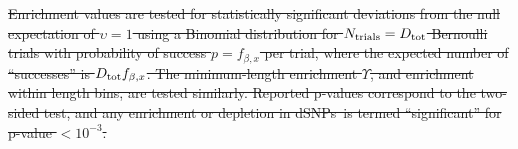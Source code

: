 \documentclass[9pt,twocolumn,twoside,lineno]{pnas-new} %
\newcommand{\dSNPs}{dSNPs~}
\newcommand{\hydrochar}{hydrophobicity class}
\providecommand{\DIFdel}[1]{{\protect\color{red}\sout{#1}}}                      %
\begin{document}
\DIFdel{Enrichment values are tested for statistically significant deviations from the null expectation of $\upsilon = 1$ using a Binomial distribution for $N_{\rm trials}=D_{\rm tot}$ Bernoulli trials with probability of success $p=f_{\beta,x}$ per trial, where the expected number of ``successes'' is $D_{\rm tot}f_{\beta,x}$.  The minimum-length enrichment $\Upsilon$, and enrichment within length bins, are tested similarly. Reported p-values correspond to the two-sided test, and any enrichment or depletion in \dSNPs is termed ``significant'' for p-value $< 10^{-3}$.
}%


\end{document}
